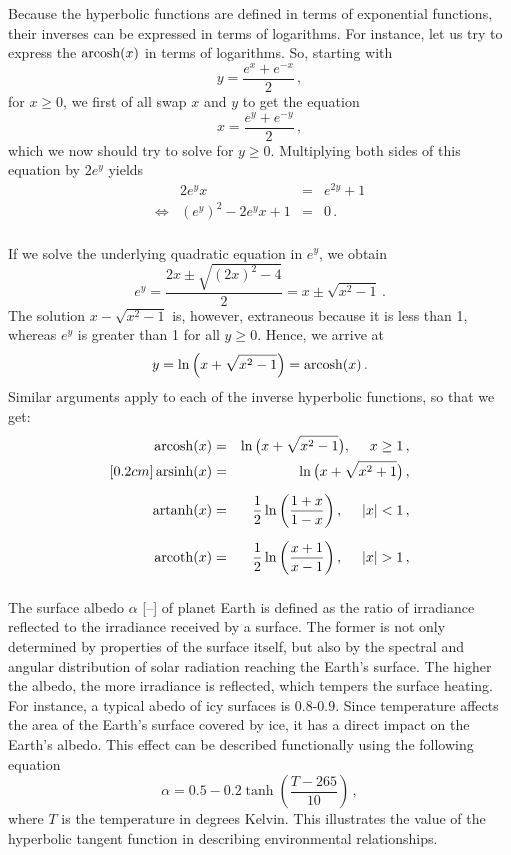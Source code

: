Because the hyperbolic functions are defined in terms of exponential functions, their inverses can be expressed in terms of logarithms. For instance, let us try to express the $\operatorname{arcosh}(x)$ in terms of logarithms. So, starting with
$$
y=\dfrac{e^x+e^{-x}}{2}\,,
$$
for $x\geq0$, we first of all swap $x$ and $y$ to get the equation
$$
x=\dfrac{e^y+e^{-y}}{2}\,,
$$
which we now should try to solve for $y\geq0$. Multiplying both sides of this equation by 
$2e^y$ yields
\renewcommand{\arraystretch}{1.5}%
\[ \begin{array}{rrcl}
&2e^{y}x&=&e^{2y}+1\\
\Leftrightarrow&\left(e^y\right)^2-2e^{y}x+1&=&0\,.\\ \end{array}\]
\renewcommand{\arraystretch}{1}%

If we solve the underlying quadratic equation in $e^y$, we obtain
$$
e^y=\dfrac{2x\pm\sqrt{(2x)^2-4}}{2}=x\pm\sqrt{x^2-1}\,.
$$
The solution $x-\sqrt{x^2-1}$ is, however, extraneous because it is less than 1, whereas $e^y$ is greater than 1 for all $y\geq0$. Hence, we arrive at
$$
y=\ln\left(x+\sqrt{x^2-1}\right)=\operatorname{arcosh}(x)\,.
$$
Similar arguments apply to each of the inverse hyperbolic functions, so that we get:
\begin{eqnarray}
\arcosh(x)&=&\ln\big(x+\sqrt{x^2-1}\big),\quad\ x\geq1\,,\\ [0.2cm]
\arsinh(x) &=& \ln\big(x+\sqrt{x^2+1}\big)\,,\\[0.2cm]
\artanh(x) &=& \dfrac{1}{2}\ln\left(\dfrac{1+x}{1-x}\right),\quad\ |x|<1\,,\\[0.2cm]
\arcoth(x) &=& \dfrac{1}{2}\ln\left(\dfrac{x+1}{x-1}\right),\quad\ |x|>1\,,\\[0.2cm]
\end{eqnarray}




\begin{remark}
The surface albedo $\alpha$ [--] of planet Earth is defined as the ratio of irradiance reflected to the irradiance received by a surface. The former is not only determined by properties of the surface itself, but also by the spectral and angular distribution of solar radiation reaching the Earth's surface. The higher the albedo, the more irradiance is reflected, which tempers the surface heating. For instance, a typical abedo of icy surfaces is 0.8-0.9. Since temperature affects the area of the Earth's surface covered by ice, it has a direct impact on the Earth's albedo. This effect can be described functionally using the following equation
$$
\alpha=0.5-0.2\tanh\left(\dfrac{T-265}{10}\right)\,,
$$
where $T$ is the temperature in degrees Kelvin. This illustrates the value of the hyperbolic tangent function in describing environmental relationships. 
\end{remark}
\fi
\fi

